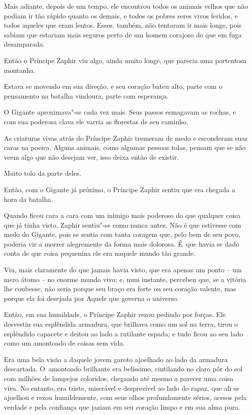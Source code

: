 Mais adiante, depois de um tempo, ele encontrou todos os animais velhos
que não podiam ir tão rápido quanto os demais, e todos os pobres seres
vivos feridos, e todos aqueles que eram lentos. Esses, também, não
tentaram ir mais longe, pois sabiam que estariam mais seguros perto de
um homem corajoso do que em fuga desamparada.

Então o Príncipe Zaphir viu algo, ainda muito longe, que parecia uma
portentosa montanha.

Estava se movendo em sua direção, e seu coração bateu alto, parte com o
pensamento na batalha vindoura, parte com esperança.

O Gigante aproximava"-se cada vez mais. Seus passos esmagavam as rochas,
e com sua poderosa clava ele varria as florestas de seu caminho.

As criaturas vivas atrás do Príncipe Zaphir tremeram de medo e
esconderam suas caras na poeira. Alguns animais, como algumas pessoas
tolas, pensam que se não veem algo que não desejam ver, isso deixa então
de existir.

Muito tolo da parte deles.

Então, com o Gigante já próximo, o Príncipe Zaphir sentiu que era
chegada a hora da batalha.



Quando ficou cara a cara com um inimigo mais poderoso do que qualquer
coisa que já tinha visto, Zaphir sentiu"-se como nunca antes. Não é que
estivesse com medo do Gigante, pois se sentia com tanta coragem que,
pelo bem de seu povo, poderia vir a morrer alegremente da forma mais
dolorosa. É~que havia se dado conta de que coisa pequenina ele era
naquele mundo tão grande.

Viu, mais claramente do que jamais havia visto, que era apenas um ponto
-- um mero átomo -- no enorme mundo vivo; e, num instante, percebeu que,
se a vitória lhe coubesse, não seria porque seu braço era forte ou seu
coração valente, mas porque ela foi desejada por Aquele que governa o
universo.

Então, em sua humildade, o Príncipe Zaphir rezou pedindo por forças. Ele
desvestiu sua esplêndida armadura, que brilhava como um sol na terra,
tirou o esplêndido capacete e deitou ao lado a rutilante espada; e tudo
ficou ao seu lado como um amontoado de coisas sem vida.

Era uma bela visão a daquele jovem garoto ajoelhado ao lado da armadura
descartada. O~amontoado brilhante era belíssimo, cintilando no claro pôr
do sol com milhões de lampejos coloridos, chegando até mesmo a parecer
uma coisa viva. No entanto, era triste, miserável e desprezível ao lado
do rapaz, que ali se ajoelhou e rezou humildemente, com seus olhos
profundamente sérios, acesos pela verdade e pela confiança que jaziam em
seu coração limpo e em sua alma pura.

